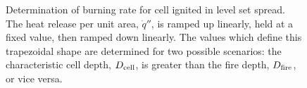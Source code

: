 \begin{figure}
    \begin{center}
        \caption[Determination of burning rate for cell ignited in level set spread]{\label{fig:LS_burning_rate} Determination of burning rate for cell ignited in level set spread. The heat release per unit area, $\dot{q}''$, is ramped up linearly, held at a fixed value, then ramped down linearly. The values which define this trapezoidal shape are determined for two possible scenarios: the characteristic cell depth, $D_{\rm cell}$, is greater than the fire depth, $D_{\rm fire}$, or vice versa.}
    \end{center}
\end{figure}

